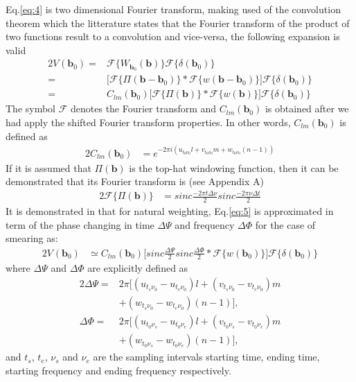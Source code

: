 Eq.\ref{eq:4} is two dimensional Fourier transform, making used of the convolution theorem which the litterature 
states that the Fourier transform of the product of two functions result to a convolution and vice-versa, the following
expansion is valid
\begin{alignat}{2}
V_{}(\mathbf{b}_0)  =& \mathcal{F}\Big\{W_{\mathbf{b}_0}(\mathbf{b})\Big\}\mathcal{F}\Big\{\delta(\mathbf{b}_0)\Big\} \\
		    =& \Bigg[\mathcal{F}\Big\{\Pi(\mathbf{b}-\mathbf{b}_0)\Big\}*\mathcal{F}\Big\{w(\mathbf{b}-\mathbf{b}_0)\Big\}\Bigg]\mathcal{F}\Big\{\delta(\mathbf{b}_0)\Big\}\\
		    =& C_{lm}(\mathbf{b}_0)\Bigg[\mathcal{F}\Big\{\Pi(\mathbf{b})\Big\}*\mathcal{F}\Big\{w(\mathbf{b})\Big\}\Bigg]\mathcal{F}\Big\{\delta(\mathbf{b}_0)\Big\}   \label{eq:5}
\end{alignat}
The symbol $\mathcal{F}$ denotes the Fourier transform and  $C_{lm}(\mathbf{b}_0)$ is obtained after we had apply the 
shifted Fourier transform properties. In other words, $C_{lm}(\mathbf{b}_0)$ is defined as
\begin{alignat*}{2}
C_{lm}(\mathbf{b}_0) &=e^{-2\pi i (u_{t_0\nu_0}l+v_{t_0\nu_0}m+w_{t_0\nu_0}(n-1))}
\end{alignat*}
If it is assumed that $\Pi(\mathbf{b})$ is the top-hat windowing function, then it can be demonstrated 
that its Fourier transform is (see Appendix A)
\begin{alignat*}{2}
\mathcal{F}\Big\{\Pi(\mathbf{b})\Big\}&=sinc\frac{-2\pi t\Delta \nu}{2}sinc\frac{-2\pi\nu\Delta t}{2}
\end{alignat*}
It is demonstrated in \citep{smirnov2011revisiting} that for  natural weighting, Eq.\ref{eq:5}  is approximated in term of the
phase changing in time $\Delta \Psi$ and frequency  $\Delta \Phi$ for the case of smearing as:
\begin{alignat*}{2}
V_{}(\mathbf{b}_0) &\simeq C_{lm}(\mathbf{b}_0)\Bigg[sinc\frac{\Delta \Psi}{2}sinc\frac{\Delta \Phi}{2}*\mathcal{F}\Big\{w(\mathbf{b}_0)\Big\}\Bigg]\mathcal{F}\Big\{\delta(\mathbf{b}_0)\Big\}
\end{alignat*}
where $\Delta \Psi$ and $\Delta \Phi$ are explicitly defined as
\begin{alignat*}{2}
\Delta \Psi =&2\pi \Big[(u_{t_s\nu_0}-u_{t_e\nu_0})l + (v_{t_s\nu_0}-v_{t_e\nu_0})m\\
	    & +(w_{t_s\nu_0}-w_{t_e\nu_0})(n-1)\Big],\\
\Delta \Phi =&2\pi \Big[(u_{t_0\nu_s}-u_{t_0\nu_e})l + (v_{t_0\nu_s}-v_{t_0\nu_e})m\\
	    & +(w_{t_0\nu_s}-w_{t_0\nu_e})(n-1)\Big],
\end{alignat*}
and $t_s$, $t_e$, $\nu_s$ and $\nu_e$ are the sampling intervals starting time, ending time, starting frequency and ending frequency respectively.\\

